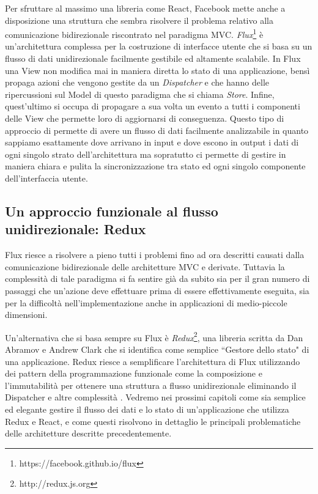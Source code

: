 Per sfruttare al massimo una libreria come React, Facebook mette anche a disposizione una struttura che sembra risolvere il problema relativo alla comunicazione bidirezionale riscontrato nel paradigma MVC. \textit{Flux}\footnote{https://facebook.github.io/flux} è un'architettura complessa per la costruzione di interfacce utente che si basa su un flusso di dati unidirezionale facilmente gestibile ed altamente scalabile. In Flux una View non modifica mai in maniera diretta lo stato di una applicazione, bensì propaga azioni che vengono gestite da un \textit{Dispatcher} e che hanno delle ripercussioni sul Model di questo paradigma che si chiama \textit{Store}. Infine, quest'ultimo si occupa di propagare a sua volta un evento a tutti i componenti delle View che permette loro di aggiornarsi di conseguenza. Questo tipo di approccio di permette di avere un flusso di dati facilmente analizzabile in quanto sappiamo esattamente dove arrivano in input e dove escono in output i dati di ogni singolo strato dell'architettura ma sopratutto ci permette di gestire in maniera chiara e pulita la sincronizzazione tra stato ed ogni singolo componente dell'interfaccia utente.

\subsection{Un approccio funzionale al flusso unidirezionale: Redux}
Flux riesce a risolvere a pieno tutti i problemi fino ad ora descritti causati dalla comunicazione bidirezionale delle architetture MVC e derivate. Tuttavia la complessità di tale paradigma si fa sentire già da subito sia per il gran numero di passaggi che un'azione deve effettuare prima di essere effettivamente eseguita, sia per la difficoltà nell'implementazione anche in applicazioni di medio-piccole dimensioni.

Un'alternativa che si basa sempre su Flux è \textit{Redux}\footnote{http://redux.js.org}, una libreria scritta da Dan Abramov e Andrew Clark che si identifica come semplice “Gestore dello stato" di una applicazione. Redux riesce a semplificare l'architettura di Flux utilizzando dei pattern della programmazione funzionale come la composizione e l'immutabilità per ottenere una struttura a flusso unidirezionale eliminando il Dispatcher e altre complessità \cite{AbramovOnReduxVsFlux}.
Vedremo nei prossimi capitoli come sia semplice ed elegante gestire il flusso dei dati e lo stato di un'applicazione che utilizza Redux e React, e come questi risolvono in dettaglio le principali problematiche delle architetture descritte precedentemente.